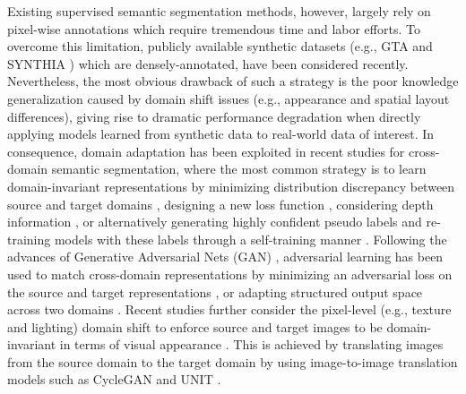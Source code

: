 \documentclass[runningheads]{llncs}
\begin{document}
	Existing supervised semantic segmentation methods, however, largely rely on pixel-wise annotations which require tremendous time and labor efforts. To overcome this limitation, publicly available synthetic datasets (e.g., GTA \cite{richter2016playing} and SYNTHIA \cite{ros2016synthia}) which are densely-annotated, have been considered recently. Nevertheless, the most obvious drawback of such a strategy is the poor knowledge generalization caused by domain shift issues (e.g., appearance and spatial layout differences), giving rise to dramatic performance degradation when directly applying models learned from synthetic data to real-world data of interest. In consequence, domain adaptation has been exploited in recent studies for cross-domain semantic segmentation, where the most common strategy is to learn domain-invariant representations by minimizing distribution discrepancy between source and target domains \cite{zhang2017curriculum,lian2019constructing}, designing a new loss function \cite{zhu2018penalizing}, considering depth information \cite{chen2019learning,vu2019dada}, or alternatively generating highly confident pseudo labels and re-training models with these labels through a self-training manner \cite{zou2018unsupervised,li2019bidirectional,huang2020contextual,pan2020unsupervised,wang2020differential,kim2020learning,yang2020fda}. Following the advances of Generative Adversarial Nets (GAN) \cite{goodfellow2014generative}, adversarial learning has been used to match cross-domain representations by minimizing an adversarial loss on the source and target representations \cite{hoffman2016fcns,luo2019significance,luo2019taking,Du_2019_ICCV}, or adapting structured output space across two domains \cite{tsai2018learning,li2019bidirectional}. Recent studies further consider the pixel-level (e.g., texture and lighting) domain shift to enforce source and target images to be domain-invariant in terms of visual appearance \cite{zhang2018fully,hoffman2017cycada,wu2018dcan,murez2018image,chen2019crdoco,yang2020context}. This is achieved by translating images from the source domain to the target domain by using image-to-image translation models such as CycleGAN \cite{zhu2017unpaired} and UNIT \cite{liu2017unsupervised}.
	


	\iffalse








\fi
	
\end{document}
